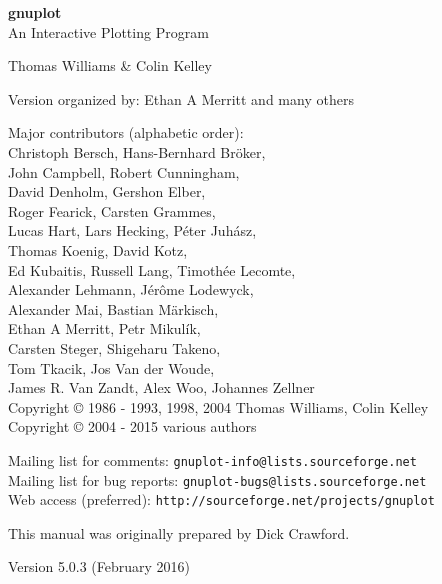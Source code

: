 \documentclass[twoside]{article}
\def\gnuplotVersion{\usebox\GpVersion}
\begin{document}
\sloppy
\thispagestyle{empty}
\rule{0in}{1.0in}

  \begin{center}

  {\huge\bf {gnuplot \gpVersion}}\\
  \vspace{3ex}
  {\Large An Interactive Plotting Program}\\

  \vspace{2ex}

  \large
  Thomas Williams \& Colin Kelley\\

  \vspace{2ex}

  Version
    \gnuplotVersion
  organized by: Ethan A Merritt and many others\\

   \vspace{2ex}

  Major contributors (alphabetic order):\\

  Christoph Bersch,
  Hans-Bernhard Bröker,\\
  John Campbell,
  Robert Cunningham,\\
  David Denholm,
  Gershon Elber,\\
  Roger Fearick,
  Carsten Grammes,\\
  Lucas Hart,
  Lars Hecking,
  Péter Juhász,\\
  Thomas Koenig,
  David Kotz,\\
  Ed Kubaitis,
  Russell Lang,
  Timothée Lecomte,\\
  Alexander Lehmann,
  Jérôme Lodewyck,\\
  Alexander Mai,
  Bastian Märkisch, \\
  Ethan A Merritt,
  Petr Mikulík,\\
  Carsten Steger,
  Shigeharu Takeno,\\
  Tom Tkacik,
  Jos Van der Woude,\\
  James R. Van Zandt,
  Alex Woo,
  Johannes Zellner\\
  Copyright {\copyright} 1986 - 1993, 1998, 2004   Thomas Williams, Colin Kelley\\
  Copyright {\copyright} 2004 - 2015  various authors\\

  \vspace{2ex}

  Mailing list for comments: \verb+gnuplot-info@lists.sourceforge.net+\\
  Mailing list for bug reports: \verb+gnuplot-bugs@lists.sourceforge.net+\\
  Web access (preferred): \verb+http://sourceforge.net/projects/gnuplot+

  \vfill
  This manual was originally prepared by Dick Crawford. \\

  \vspace{2ex}

   Version 5.0.3 (February 2016)

   \end{center}
\newpage


\hypertarget{TableOfContents}{}
\tableofcontents

\newpage
\end{document}
